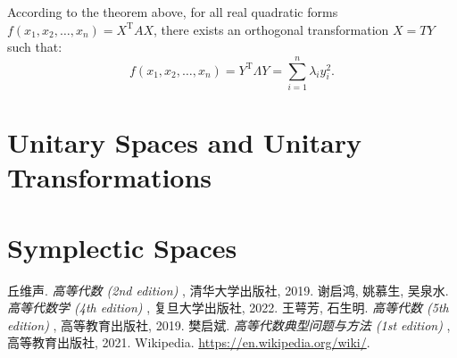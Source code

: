 \documentclass[11pt]{../../TexTemplate/elegantbook} %
\begin{document}
\begin{note}
    According to the theorem above,
    for all real quadratic forms \( f(x_1, x_2, \dots, x_n) = X^{\mathrm{T}} A X \),
    there exists an orthogonal transformation \( X = T Y \) such that:
    \[
    f(x_1, x_2, \dots, x_n) = Y^{\mathrm{T}} \Lambda Y = \sum_{i=1}^{n} \lambda_i y_i^2.
    \]
\end{note}

\section{Unitary Spaces and Unitary Transformations}

\section{Symplectic Spaces}

\begin{thebibliography}{99} 
 丘维声. \emph{ 高等代数 (2nd edition) }, 清华大学出版社, 2019. 
 谢启鸿, 姚慕生, 吴泉水. \emph{ 高等代数学 (4th edition) }, 复旦大学出版社, 2022.
 王萼芳, 石生明. \emph{ 高等代数 (5th edition) }, 高等教育出版社, 2019.
 樊启斌. \emph{ 高等代数典型问题与方法 (1st edition) }, 高等教育出版社, 2021.
 Wikipedia. \url{https://en.wikipedia.org/wiki/}.
\end{thebibliography}
\end{document}
